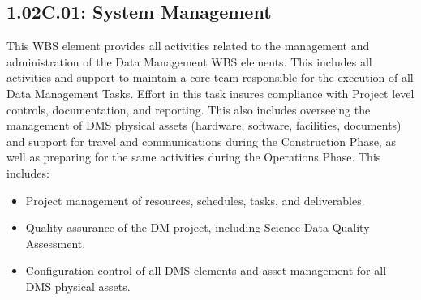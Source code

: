 \subsection{1.02C.01: System Management}

This WBS element provides all activities related to the management and
administration of the Data Management WBS elements. This includes all activities
and support to maintain a core team responsible for the execution of all Data
Management Tasks. Effort in this task insures compliance with Project level
controls, documentation, and reporting. This also includes overseeing the
management of DMS physical assets (hardware, software, facilities, documents)
and support for travel and communications during the Construction Phase, as
well as preparing for the same activities during the Operations Phase. This
includes:

\begin{itemize}

  \item{Project management of resources, schedules, tasks, and deliverables.}

  \item{Quality assurance of the DM project, including Science Data Quality
  Assessment.}

  \item{Configuration control of all DMS elements and asset management for all
  DMS physical assets.}

\end{itemize}
